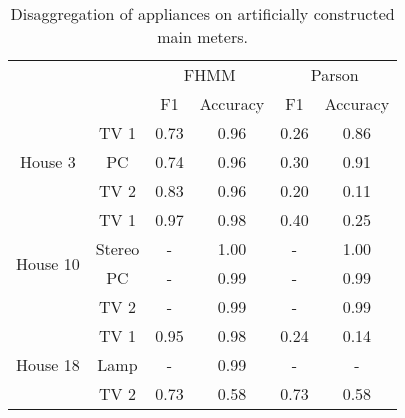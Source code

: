 \begin{table}[H]                             
\centering                                   
\begin{tabular}{cc|c|c|c|c|}
\cline{3-6}
                                                &        & \multicolumn{2}{c|}{FHMM} & \multicolumn{2}{c|}{Parson} \\ \cline{3-6} 
                                                &        & F1        & Accuracy      & F1         & Accuracy       \\ \hline
\multicolumn{1}{|c|}{\multirow{3}{*}{House 3}}  & TV 1   & 0.73      & 0.96          & 0.26       & 0.86           \\ \cline{2-6} 
\multicolumn{1}{|c|}{}                          & PC     & 0.74      & 0.96          & 0.30       & 0.91           \\ \cline{2-6} 
\multicolumn{1}{|c|}{}                          & TV 2   & 0.83      & 0.96          & 0.20       & 0.11           \\ \hline
\multicolumn{1}{|c|}{\multirow{4}{*}{House 10}} & TV 1   & 0.97      & 0.98          & 0.40       & 0.25           \\ \cline{2-6} 
\multicolumn{1}{|c|}{}                          & Stereo & -         & 1.00          & -          & 1.00           \\ \cline{2-6} 
\multicolumn{1}{|c|}{}                          & PC     & -         & 0.99          & -          & 0.99           \\ \cline{2-6} 
\multicolumn{1}{|c|}{}                          & TV 2   & -         & 0.99          & -          & 0.99           \\ \hline
\multicolumn{1}{|c|}{\multirow{3}{*}{House 18}} & TV 1   & 0.95      & 0.98          & 0.24       & 0.14           \\ \cline{2-6} 
\multicolumn{1}{|c|}{}                          & Lamp   & -         & 0.99          & -          & -              \\ \cline{2-6} 
\multicolumn{1}{|c|}{}                          & TV 2   & 0.73      & 0.58          & 0.73       & 0.58           \\ \hline
\end{tabular}                              
\caption{Disaggregation of appliances on artificially constructed main meters.}                     
\label{table:Tab:SHGSIM}                     
\end{table} 
